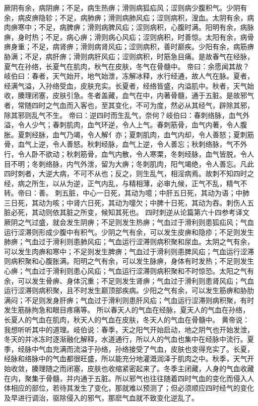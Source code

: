 \documentclass[a4paper,12pt,UTF8,twoside]{ctexbook}
\begin{document}
厥阴有余，病阴痹；不足，病生热痹；滑则病狐疝风；涩则病少腹积气。少阴有余，病皮痹隐轸；不足，病肺痹；滑则病肺风疝；涩则病积，溲血。太阴有余，病肉痹寒中；不足，病脾痹；滑则病脾风疝；涩则病积，心腹时满。阳明有余，病脉痹，身时热；不足，病心痹；滑则病心风疝；涩则病积，时善惊。太阳有余，病骨痹身重；不足，病肾痹；滑则病肾风疝；涩则病积，善时巅疾。少阳有余，病筋痹胁满；不足，病肝痹；滑则病肝风疝；涩则病积，时筋急目痛。是故春气在经脉，夏气在孙络，长夏气在肌肉，秋气在皮肤，冬气在骨髓中。
帝曰：余愿闻其故？岐伯曰：春者，天气始开，地气始泄，冻解冰释，水行经通，故人气在脉。夏者，经满气溢，入孙络受血，皮肤充实。长夏者，经络皆盛，内溢肌中。秋者，天气始收，腠理闭塞，皮肤引急。冬者盖藏，血气在中，内著骨髓，通于五脏。是故邪气者，常随四时之气血而入客也，至其变化，不可为度，然必从其经气，辟除其邪，除其邪则乱气不生。
帝曰：逆四时而生乱气，奈何？岐伯曰：春刺络脉，血气外溢，令人少气；春刺肌肉，血气环逆，令人上气。春刺筋骨，血气内著，令人腹胀。夏刺经脉，血气乃竭，令人解亻亦；夏刺肌肉，血气内却，令人善怒；夏刺筋骨，血气上逆，令人善怒。秋刺经脉，血气上逆，令人善忘；秋刺络脉，气不外行，令人卧不欲动；秋刺筋骨，血气内散，令人寒栗，冬刺经脉，血气皆脱，令人目不明；冬刺络脉，内气外泄，留为大痹；冬刺肌肉，阳气竭绝，令人善忘。凡此四时刺者，大逆大病，不可不从也；反之，则生乱气，相淫病焉。故刺不知四时之经，病之所生，以从为逆，正气内乱，与精相薄，必审九候，正气不乱，精气不转。帝曰：善。
刺五脏，中心一日死，其动为噫；中肝五日死，其动为语；中肺三日死，其动为咳；中肾六日死，其动为嚏欠；中脾十日死，其动为吞。刺伤人五脏必死，其动则依其脏之所变，候知其死也。
四时刺逆从论篇第六十四参考译文
厥阴之气过盛，就会发生阴痹；不足则发生热痹；气血过于滑利则患狐疝风；气血运行涩滞则形成少腹中有积气。少阴之气有余，可以发生皮痹和隐疹；不足则发生肺痹；气血过于滑利则患肺风疝；气血运行涩滞则病积聚和尿血。太阴之气有余，可以发生肉痹和寒中；不足则发生脾痹；气血过于滑利则患脾风疝；气血运行涩滞则病积聚和心腹胀满。阳明之气有余，可以发生脉痹，身体有时发热；不足则发生心痹；气血过于滑利则患心风疝；气血运行涩滞则病积聚和不时惊恐。太阳之气有余，可以发生骨痹、身体沉重；不足则发生肾痹；气血过于滑利则患肾风疝；气血运行涩滞则病积聚，且不时发生巅顶部疾病。少阳之气有余，可以发生筋痹和胁肋满闷；不足则发身肝痹；气血过于滑利则患肝风疝；气血运行涩滞则病积聚，有时发生筋脉拘急和眼目疼痛等。
所以春天人的气血在经脉，夏天人的气血在孙络，长夏人的气血在肌肉，秋天人的气血在皮肤，冬天人的气血在骨髓中。
黄帝说：我想听听其中的道理。岐伯说：春季，天之阳气开始启动，地之阴气也开始发泄，冬天的并冰冻时逐渐融化解释，水道通行，所以人的气血也集中在经脉中流行。夏季，经脉中气血充满而流溢于孙络，孙络接受了气血，皮肤也变得充实了。长夏，经脉和络脉中的气血都很旺盛，所以能充分地灌溉润泽于肌肉之中。秋季，天气开始收敛，腠理随之而闭塞，皮肤也收缩紧密起来了。冬季主闭藏，人身的气血收藏在内，聚集于骨髓，并内通于五脏。所以邪气也往往随着四时气血的变化而侵入人体相应的部位，若待其发生了变化，那就难以预测了；但必须顺应四时经气的变化及早进行调治，驱除侵入的邪气，那麽气血就不致变化逆乱了。
\end{document}

